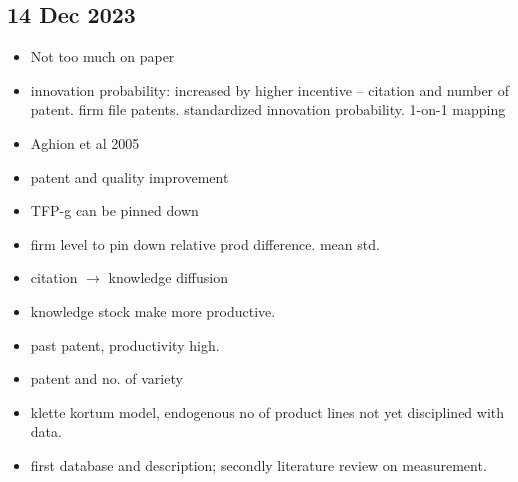 	\subsection{14 Dec 2023}
		\begin{itemize}
			\item Not too much on paper 
			\item innovation probability: increased by higher incentive -- citation and number of patent. firm file patents. standardized innovation probability. 1-on-1 mapping
			\item Aghion et al 2005
			\item patent and quality improvement
			\item TFP-g can be pinned down
			\item firm level to pin down relative prod difference. mean std. 
			\item citation \(\rightarrow\) knowledge diffusion
			\item knowledge stock make more productive.
			\item past patent, productivity high.
			\item patent and no. of variety
			\item klette kortum model, endogenous no of product lines not yet disciplined with data.
			\item first database and description; secondly literature review on measurement. 
		\end{itemize}
\newpage

\footnotesize



